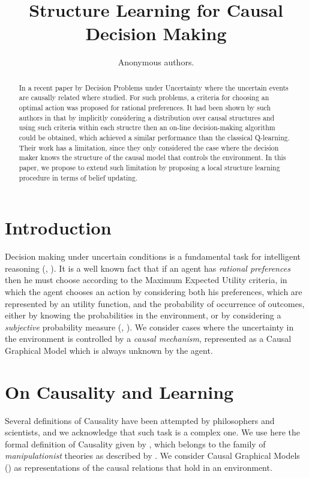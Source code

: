 \documentclass[letterpaper]{article}
\title{Structure Learning for Causal Decision Making}
\author{Anonymous authors.} %
\begin{document}
\maketitle

\begin{abstract}
In a recent paper by \cite{2019arXiv190202279G} Decision Problems under Uncertainty where the uncertain events are causally related where studied. For such problems, a criteria for choosing an optimal action was proposed for rational preferences. It had been shown by such authors in \cite{gonzalez2018playing} that by implicitly considering a distribution over causal structures and using such criteria within each structre then an on-line decision-making algorithm could be obtained, which achieved a similar performance than the classical Q-learning. Their work has a limitation, since they only considered the case where the decision maker knows the structure of the causal model that controls the environment. In this paper, we propose to extend such limitation by proposing a local structure learning procedure in terms of belief updating. 
\end{abstract}

\section{Introduction}
Decision making under uncertain conditions is a fundamental task for intelligent reasoning (\cite{danks2014unifying}, \cite{lake2017building}). It is a well known fact that if an agent has \textit{rational preferences} then he must choose according to the Maximum Expected Utility criteria, in which the agent chooses an action by considering both his preferences, which are represented by an utility function, and the probability of occurrence of outcomes, either by knowing the probabilities in the environment, or by considering a \textit{subjective} probability measure (\cite{bernardo2000bayesian}, \cite{gilboa2009decision}). We consider cases where the uncertainty in the environment is controlled by a \textit{causal mechanism}, represented as a Causal Graphical Model which is always unknown by the agent. 


\section{On Causality and Learning}
Several definitions of Causality have been attempted by philosophers and scientists, and we acknowledge that such task is a complex one. We use here the formal definition of Causality given by \cite{spirtes2000causation}, which belongs to the family of \textit{manipulationist} theories as described by \cite{woodward2005making}. We consider Causal Graphical Models (\cite{koller2009probabilistic}) as representations of the causal relations that hold in an environment.
\end{document}
